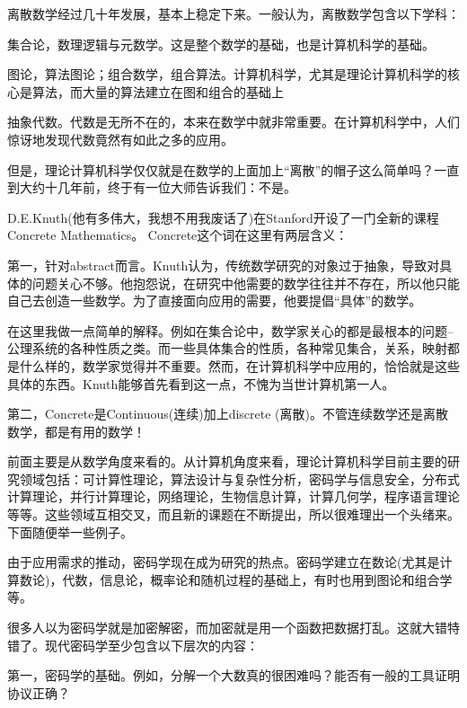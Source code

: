 离散数学经过几十年发展，基本上稳定下来。一般认为，离散数学包含以下学科： 

\begin{compactenum}
\item 集合论，数理逻辑与元数学。这是整个数学的基础，也是计算机科学的基础。 
\item 图论，算法图论；组合数学，组合算法。计算机科学，尤其是理论计算机科学的核心是算法，而大量的算法建立在图和组合的基础上 
\item 抽象代数。代数是无所不在的，本来在数学中就非常重要。在计算机科学中，人们惊讶地发现代数竟然有如此之多的应用。 
\end{compactenum}



但是，理论计算机科学仅仅就是在数学的上面加上“离散”的帽子这么简单吗？一直到大约十几年前，终于有一位大师告诉我们：不是。 

D.E.Knuth(他有多伟大，我想不用我废话了)在Stanford开设了一门全新的课程Concrete Mathematics。 Concrete这个词在这里有两层含义： 

第一，针对abstract而言。Knuth认为，传统数学研究的对象过于抽象，导致对具体的问题关心不够。他抱怨说，在研究中他需要的数学往往并不存在，所以他只能自己去创造一些数学。为了直接面向应用的需要，他要提倡“具体”的数学。 

在这里我做一点简单的解释。例如在集合论中，数学家关心的都是最根本的问题--公理系统的各种性质之类。而一些具体集合的性质，各种常见集合，关系，映射都是什么样的，数学家觉得并不重要。然而，在计算机科学中应用的，恰恰就是这些具体的东西。Knuth能够首先看到这一点，不愧为当世计算机第一人。 

第二，Concrete是Continuous(连续)加上discrete (离散)。不管连续数学还是离散数学，都是有用的数学！ 

前面主要是从数学角度来看的。从计算机角度来看，理论计算机科学目前主要的研究领域包括：可计算性理论，算法设计与复杂性分析，密码学与信息安全，分布式计算理论，并行计算理论，网络理论，生物信息计算，计算几何学，程序语言理论等等。这些领域互相交叉，而且新的课题在不断提出，所以很难理出一个头绪来。下面随便举一些例子。 

由于应用需求的推动，密码学现在成为研究的热点。密码学建立在数论(尤其是计算数论)，代数，信息论，概率论和随机过程的基础上，有时也用到图论和组合学等。 

很多人以为密码学就是加密解密，而加密就是用一个函数把数据打乱。这就大错特错了。现代密码学至少包含以下层次的内容： 

第一，密码学的基础。例如，分解一个大数真的很困难吗？能否有一般的工具证明协议正确？ 

